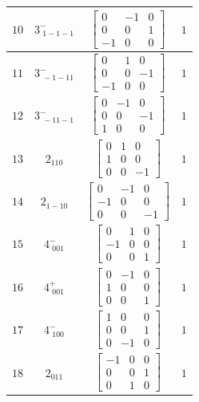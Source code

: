 \documentclass[fleqn,8pt]{jsarticle}
\begin{document}
\begin{longtable}{cccc}
$ 10 $ & $ 3^{-}_{\,\,1-1-1} $ & $ \begin{bmatrix} 0 & -1 & 0 \\ 0 & 0 & 1 \\ -1 & 0 & 0 \end{bmatrix} $ & $ 1 $ \\ \hline
$ 11 $ & $ 3^{-}_{\,\,-1-11} $ & $ \begin{bmatrix} 0 & 1 & 0 \\ 0 & 0 & -1 \\ -1 & 0 & 0 \end{bmatrix} $ & $ 1 $ \\ \hline
$ 12 $ & $ 3^{-}_{\,\,-11-1} $ & $ \begin{bmatrix} 0 & -1 & 0 \\ 0 & 0 & -1 \\ 1 & 0 & 0 \end{bmatrix} $ & $ 1 $ \\ \hline
$ 13 $ & $ 2{}_{110} $ & $ \begin{bmatrix} 0 & 1 & 0 \\ 1 & 0 & 0 \\ 0 & 0 & -1 \end{bmatrix} $ & $ 1 $ \\ \hline
$ 14 $ & $ 2{}_{1-10} $ & $ \begin{bmatrix} 0 & -1 & 0 \\ -1 & 0 & 0 \\ 0 & 0 & -1 \end{bmatrix} $ & $ 1 $ \\ \hline
$ 15 $ & $ 4^{-}_{\,\,001} $ & $ \begin{bmatrix} 0 & 1 & 0 \\ -1 & 0 & 0 \\ 0 & 0 & 1 \end{bmatrix} $ & $ 1 $ \\ \hline
$ 16 $ & $ 4^{+}_{\,\,001} $ & $ \begin{bmatrix} 0 & -1 & 0 \\ 1 & 0 & 0 \\ 0 & 0 & 1 \end{bmatrix} $ & $ 1 $ \\ \hline
$ 17 $ & $ 4^{-}_{\,\,100} $ & $ \begin{bmatrix} 1 & 0 & 0 \\ 0 & 0 & 1 \\ 0 & -1 & 0 \end{bmatrix} $ & $ 1 $ \\ \hline
$ 18 $ & $ 2{}_{011} $ & $ \begin{bmatrix} -1 & 0 & 0 \\ 0 & 0 & 1 \\ 0 & 1 & 0 \end{bmatrix} $ & $ 1 $ \\ \hline

\end{longtable}
\end{document}
